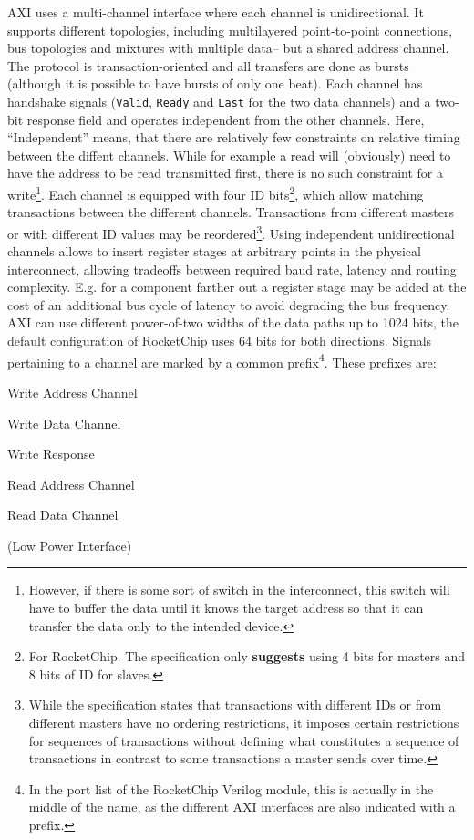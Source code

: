 \documentclass[journal,a4paper]{IEEEtran}
\begin{document}
AXI uses a multi-channel interface where each channel is unidirectional.
It supports different topologies, including multilayered point-to-point connections, bus topologies and mixtures with multiple data-- but a shared address channel.
The protocol is transaction-oriented and all transfers are done as bursts (although it is possible to have bursts of only one beat).
Each channel has handshake signals (\texttt{Valid}, \texttt{Ready} and \texttt{Last} for the two data channels) and a two-bit response field and operates independent from the other channels.
Here, ``Independent'' means, that there are relatively few constraints on relative timing between the diffent channels.
While for example a read will (obviously) need to have the address to be read transmitted first, there is no such constraint for a write\footnote{However, if there is some sort of switch in the interconnect, this switch will have to buffer the data until it knows the target address so that it can transfer the data only to the intended device.}.
Each channel is equipped with four ID bits\footnote{For RocketChip. The specification only \textbf{suggests} using 4 bits for masters and 8 bits of ID for slaves.}, which allow matching transactions between the different channels.
Transactions from different masters or with different ID values may be reordered\footnote{While the specification states that transactions with different IDs or from different masters have no ordering restrictions, it imposes certain restrictions for sequences of transactions\cite[5.3]{axi} without defining what constitutes a sequence of transactions in contrast to some transactions a master sends over time.}.
Using independent unidirectional channels allows to insert register stages at arbitrary points in the physical interconnect, allowing tradeoffs between required baud rate, latency and routing complexity. E.g. for a component farther out a register stage may be added at the cost of an additional bus cycle of latency to avoid degrading the bus frequency.
AXI can use different power-of-two widths of the data paths up to 1024 bits, the default configuration of RocketChip uses 64 bits for both directions.
Signals pertaining to a channel are marked by a common prefix\footnote{In the port list of the RocketChip Verilog module, this is actually in the middle of the name, as the different AXI interfaces are also indicated with a prefix.}.
These prefixes are:
\enlargethispage*{1\baselineskip}
%
\begin{description}
	\item[\texttt{\ldots\_aw\_\ldots}]   Write Address Channel
	\item[\texttt{\ldots\_w\_\ldots}]    Write Data Channel
	\item[\texttt{\ldots\_b\_\ldots}]    Write Response
	\item[\texttt{\ldots\_ar\_\ldots}]   Read Address Channel
	\item[\texttt{\ldots\_r\_\ldots}]    Read Data Channel
	\item[\texttt{\ldots\_c\_\ldots}]    (Low Power Interface)
\end{description}
\end{document}
